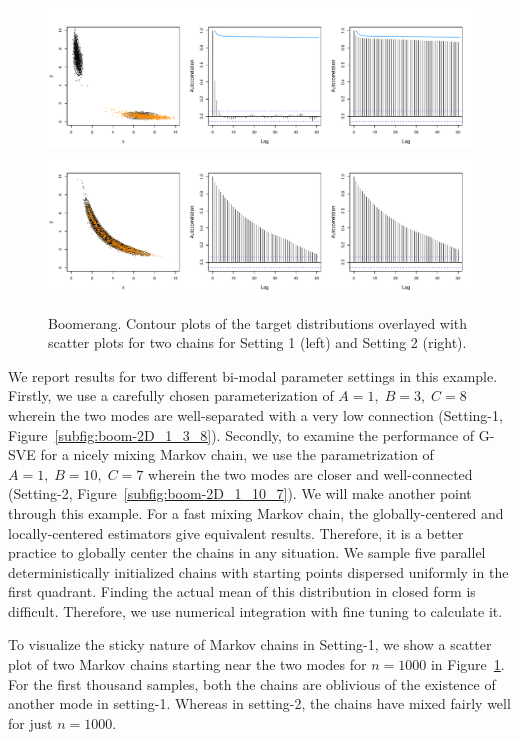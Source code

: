 \documentclass[11pt]{article}
\theoremstyle{remark}
\begin{document}
\begin{figure}[h]
    \centering
    \includegraphics[width = .8\textwidth]{plots/boom-all_1_3_8.pdf}\\
    \includegraphics[width = .8\textwidth]{plots/boom-all_1_10_7.pdf}    

    \caption{Boomerang. Contour plots of the target distributions  overlayed with scatter plots for two chains for Setting 1 (left) and Setting 2 (right).}
   \label{fig:boom-2D}
\end{figure}


We report results for two different bi-modal parameter settings in this example. Firstly, we use a carefully chosen parameterization of $A = 1,\; B = 3,\; C = 8$ wherein the two modes are well-separated with a very low connection (Setting-1, Figure~\ref{subfig:boom-2D_1_3_8}). Secondly, to examine the performance of G-SVE for a nicely mixing Markov chain, we use the parametrization of $A = 1, \; B = 10, \; C=7$ wherein the two modes are closer and well-connected (Setting-2, Figure~\ref{subfig:boom-2D_1_10_7}). We will make another point through this example. For a fast mixing Markov chain, the globally-centered and locally-centered estimators give equivalent results. Therefore, it is a better practice to globally center the chains in any situation. We sample five parallel deterministically initialized chains with starting points dispersed uniformly in the first quadrant. Finding the actual mean of this distribution in closed form is difficult. Therefore, we use numerical integration with fine tuning to calculate it.


 To visualize the sticky nature of Markov chains in Setting-1, we show a scatter plot of two Markov chains starting near the two modes for $n = 1000$ in Figure~\ref{fig:boom-2D}. For the first thousand samples, both the chains are oblivious of the existence of another mode in setting-1. Whereas in setting-2, the chains have mixed fairly well for just $n=1000$.
 
\end{document}
